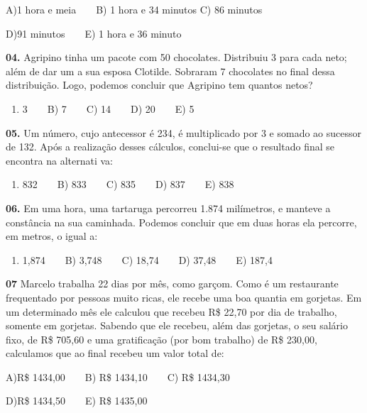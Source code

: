 \documentclass[
  12pt,
]{article}
\providecommand{\tightlist}{%
  \setlength{\itemsep}{0pt}\setlength{\parskip}{0pt}}
\begin{document}
A)1 hora e meia ~ ~ B) 1 hora e 34 minutos C) 86 minutos

D)91 minutos ~ ~ E) 1 hora e 36 minuto

\vspace{1cm}

\textbf{04.} Agripino tinha um pacote com 50 chocolates. Distribuiu 3
para cada neto; além de dar um a sua esposa Clotilde. Sobraram 7
chocolates no final dessa distribuição. Logo, podemos concluir que
Agripino tem quantos netos?

\begin{enumerate}
\def\labelenumi{\Alph{enumi})}
\tightlist
\item
  3 ~ ~ B) 7 ~ ~ C) 14 ~ ~ D) 20 ~ ~ E) 5
\end{enumerate}

\vspace{0.8cm}

\textbf{05.} Um número, cujo antecessor é 234, é multiplicado por 3 e
somado ao sucessor de 132. Após a realização desses cálculos, conclui-se
que o resultado final se encontra na alternati va:

\begin{enumerate}
\def\labelenumi{\Alph{enumi})}
\tightlist
\item
  832 ~ ~ B) 833 ~ ~ C) 835 ~ ~ D) 837 ~ ~ E) 838
\end{enumerate}

\textbf{06.} Em uma hora, uma tartaruga percorreu 1.874 milímetros, e
manteve a constância na sua caminhada. Podemos concluir que em duas
horas ela percorre, em metros, o igual a:

\begin{enumerate}
\def\labelenumi{\Alph{enumi})}
\tightlist
\item
  1,874 ~ ~ B) 3,748 ~ ~ C) 18,74 ~ ~ D) 37,48 ~ ~ E) 187,4
\end{enumerate}

\textbf{07} Marcelo trabalha 22 dias por mês, como garçom. Como é um
restaurante frequentado por pessoas muito ricas, ele recebe uma boa
quantia em gorjetas. Em um determinado mês ele calculou que recebeu R\$
22,70 por dia de trabalho, somente em gorjetas. Sabendo que ele recebeu,
além das gorjetas, o seu salário fixo, de R\$ 705,60 e uma gratificação
(por bom trabalho) de R\$ 230,00, calculamos que ao final recebeu um
valor total de:

A)R\$ 1434,00 ~ ~ B) R\$ 1434,10 ~ ~ C) R\$ 1434,30

D)R\$ 1434,50 ~ ~ E) R\$ 1435,00
\end{document}
